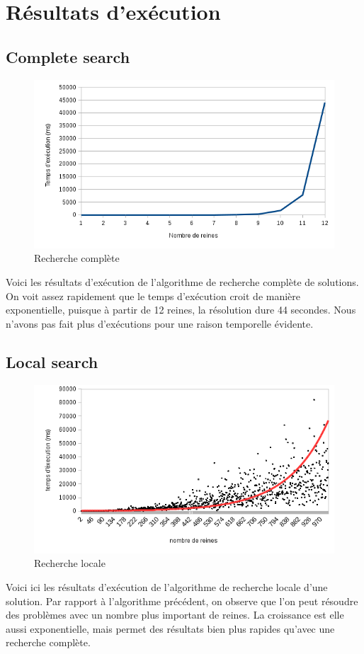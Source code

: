 \documentclass{article}
\begin{document}
\section{Résultats d'exécution}
\subsection{Complete search}
\begin{figure}[!h]
	\caption{\label{csearch} Recherche complète}
	\begin{center}
	\includegraphics[scale=0.5]{./picture/compelte_search.png}
	\end{center}
\end{figure}
Voici les résultats d'exécution de l'algorithme de recherche complète de solutions. On voit assez rapidement que le temps d'exécution croit de manière exponentielle, puisque à partir de 12 reines, la résolution dure 44 secondes. Nous n'avons pas fait plus d'exécutions pour une raison temporelle évidente.
\clearpage

\subsection{Local search}
\begin{figure}[!h]
	\caption{\label{lsearch} Recherche locale}
	\begin{center}
	\includegraphics[scale=0.5]{./picture/local_search.png}
	\end{center}
\end{figure}
Voici ici les résultats d'exécution de l'algorithme de recherche locale d'une solution. Par rapport à l'algorithme précédent, on observe que l'on peut résoudre des problèmes avec un nombre plus important de reines. La croissance est elle aussi exponentielle, mais permet des résultats bien plus rapides qu'avec une recherche complète. 
\end{document}
